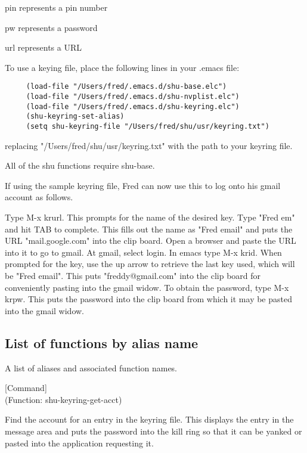 pin represents a pin number

pw represents a password

url represents a URL

To use a keying file, place the following lines in your .emacs file:

\small{\begin{verbatim}
     (load-file "/Users/fred/.emacs.d/shu-base.elc")
     (load-file "/Users/fred/.emacs.d/shu-nvplist.elc")
     (load-file "/Users/fred/.emacs.d/shu-keyring.elc")
     (shu-keyring-set-alias)
     (setq shu-keyring-file "/Users/fred/shu/usr/keyring.txt")
\end{verbatim}}

replacing "/Users/fred/shu/usr/keyring.txt" with the path to your keyring file.

All of the shu functions require shu-base.

If using the sample keyring file, Fred can now use this to log onto his gmail
account as follows.

Type M-x krurl.  This prompts for the name of the desired key.  Type "Fred em"
and hit TAB to complete.  This fills out the name as "Fred email" and puts the
URL "mail.google.com" into the clip board.  Open a browser and paste the URL
into it to go to gmail.  At gmail, select login.  In emacs type M-x krid.
When prompted for the key, use the up arrow to retrieve the last key used,
which will be "Fred email".  This puts "freddy@gmail.com" into the clip board
for conveniently pasting into the gmail widow.  To obtain the password, type
M-x krpw.  This puts the password into the clip board from which it may be
pasted into the gmail widow.


\subsection{List of functions by alias name}

A list of aliases and associated function names.



\vspace{1em}
\noindent
{}
\usebox{\funcname}
 \hfill [Command]\\%
 (Function: shu-keyring-get-acct)

\begin{doc-string}
Find the account for an entry in the keyring file.  This displays the entry in the message
area and puts the password into the kill ring so that it can be yanked or pasted into the application
requesting it.
\end{doc-string}

